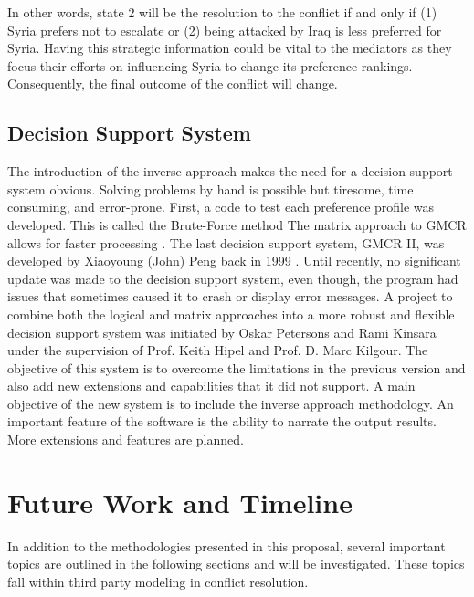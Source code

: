 \documentclass[letterpaper,12pt,titlepage,oneside,final]{book}
\begin{document}
In other words, state 2 will be the resolution to the conflict if and only if (1) Syria prefers not to escalate or (2) being attacked by Iraq is less preferred for Syria. Having this strategic information could be vital to the mediators as they focus their efforts on influencing Syria to change its preference rankings. Consequently, the final outcome of the conflict will change.




\section{Decision Support System}

The introduction of the inverse approach makes the need for a decision support system obvious. Solving problems by hand is possible but tiresome, time consuming, and error-prone. First, a code to test each preference profile was developed. This is called the Brute-Force method
The matrix approach to GMCR allows for faster processing \citep{xu2007matrix,xu2009}. The last decision support system, GMCR II, was developed by Xiaoyoung (John) Peng back in 1999 \citep{peng1999decision}. Until recently, no significant update was made to the decision support system, even though, the program had issues that sometimes caused it to crash or display error messages.
A project to combine both the logical and matrix approaches into a more robust and flexible decision support system was initiated by Oskar Petersons and Rami Kinsara under the supervision of Prof. Keith Hipel and Prof. D. Marc Kilgour. The objective of this system is to overcome the limitations in the previous version and also add new extensions and capabilities that it did not support. A main objective of the new system is to include the inverse approach methodology. An important feature of the software is the ability to narrate the output results. More extensions and features are planned.




\chapter{Future Work and Timeline}
In addition to the methodologies presented in this proposal, several important topics are outlined in the following sections and will be investigated. These topics fall within third party modeling in conflict resolution.
\end{document}

